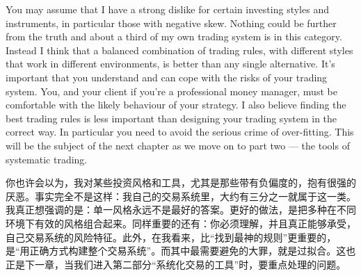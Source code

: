 
\begin{englishblock} You may assume that I have a strong dislike for certain investing styles and instruments, in particular those with negative skew. Nothing could be further from the truth and about a third of my own trading system is in this category. Instead I think that a balanced combination of trading rules, with different styles that work in different environments, is better than any single alternative. It's important that you understand and can cope with the risks of your trading system. You, and your client if you're a professional money manager, must be comfortable with the likely behaviour of your strategy. I also believe finding the best trading rules is less important than designing your trading system in the correct way. In particular you need to avoid the serious crime of over-fitting. This will be the subject of the next chapter as we move on to part two --- the tools of systematic trading. \end{englishblock}

\begin{chineseblock}你也许会以为，我对某些投资风格和工具，尤其是那些带有负偏度的，抱有很强的厌恶。事实完全不是这样：我自己的交易系统里，大约有三分之一就属于这一类。我真正想强调的是：单一风格永远不是最好的答案。更好的做法，是把多种在不同环境下有效的风格组合起来。同样重要的还有：你必须理解，并且真正能够承受，自己交易系统的风险特征。此外，在我看来，比“找到最神的规则”更重要的，是“用正确方式构建整个交易系统”。而其中最需要避免的大罪，就是过拟合。这也正是下一章，当我们进入第二部分“系统化交易的工具”时，要重点处理的问题。\end{chineseblock}
